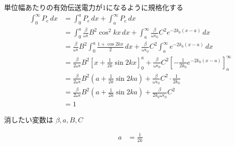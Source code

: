 \documentclass[a4paper,10pt]{bxjsarticle}
\begin{document}
単位幅あたりの有効伝送電力が$1$になるように規格化する
\begin{align*}
    \int_0^\infty P_e \,dx 
    &= \int_0^a P_e \,dx + \int_a^\infty P_e \,dx\\
    &= \int_0^a \frac{\beta}{\omega \epsilon} B^2 \cos^2 kx  \,dx 
     + \int_a^\infty \frac{\beta}{\omega \epsilon_0} C^2 e^{-2k_0(x-a)} \,dx\\
    &= \frac{\beta}{\omega \epsilon} B^2 \int_0^a \frac{1+\cos 2kx}{2}  \,dx 
     + \frac{\beta}{\omega \epsilon_0} C^2 \int_a^\infty  e^{-2k_0(x-a)} \,dx\\
    &= \frac{\beta}{2\omega \epsilon} B^2 \left[ x + \frac{1}{2k} \sin 2kx \right]_0^a 
     + \frac{\beta}{\omega \epsilon_0} C^2 \left[ -\frac{1}{2k_0} e^{-2k_0(x-a)} \right]_a^\infty \\
    &= \frac{\beta}{2\omega \epsilon} B^2 \left( a + \frac{1}{2k} \sin 2ka \right)
     + \frac{\beta}{\omega \epsilon_0} C^2 \cdot \frac{1}{2k_0} \\
    &= \frac{\beta}{2\omega \epsilon} B^2 \left( a + \frac{1}{2k} \sin 2ka \right) + \frac{\beta}{2k_0 \omega \epsilon_0} C^2 \\
    &= 1
\end{align*}

消したい変数は $\beta, a, B, C$

\begin{align*}
    a &= \frac{1}{2k} \\ %
\end{align*}




  
\end{document}
